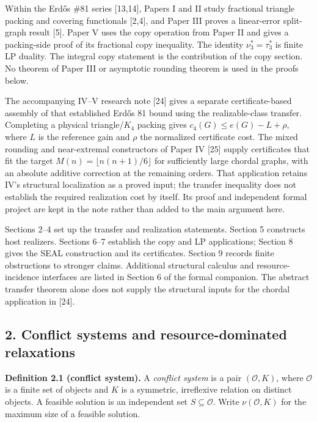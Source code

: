 \documentclass[english,11pt,a4paper]{article}
\begin{document}
Within the Erdős \#81 series {[}13,14{]}, Papers I and II study
fractional triangle packing and covering functionals {[}2,4{]}, and
Paper III proves a linear-error split-graph result {[}5{]}. Paper V uses
the copy operation from Paper II and gives a packing-side proof of its
fractional copy inequality. The identity \(\nu_3^*=\tau_3^*\) is finite
LP duality. The integral copy statement is the contribution of the copy
section. No theorem of Paper III or asymptotic rounding theorem is used
in the proofs below.

The accompanying IV--V research note {[}24{]} gives a separate
certificate-based assembly of that established Erdős 81 bound using the
realizable-class transfer. Completing a physical triangle/\(K_4\)
packing gives \(c_4(G)\le e(G)-L+\rho\), where \(L\) is the reference
gain and \(\rho\) the normalized certificate cost. The mixed rounding
and near-extremal constructors of Paper IV {[}25{]} supply certificates
that fit the target \(M(n)=\lfloor n(n+1)/6\rfloor\) for sufficiently
large chordal graphs, with an absolute additive correction at the
remaining orders. That application retains IV's structural localization
as a proved input; the transfer inequality does not establish the
required realization cost by itself. Its proof and independent formal
project are kept in the note rather than added to the main argument
here.

Sections 2--4 set up the transfer and realization statements. Section 5
constructs host realizers. Sections 6--7 establish the copy and LP
applications; Section 8 gives the SEAL construction and its
certificates. Section 9 records finite obstructions to stronger claims.
Additional structural calculus and resource-incidence interfaces are
listed in Section 6 of the formal companion. The abstract transfer
theorem alone does not supply the structural inputs for the chordal
application in {[}24{]}.

\subsection{2. Conflict systems and resource-dominated
relaxations}\label{conflict-systems-and-resource-dominated-relaxations}

\textbf{Definition 2.1 (conflict system).} A \emph{conflict system} is a
pair \((\mathcal O,K)\), where \(\mathcal O\) is a finite set of objects
and \(K\) is a symmetric, irreflexive relation on distinct objects. A
feasible solution is an independent set \(S\subseteq\mathcal O\). Write
\(\nu(\mathcal O,K)\) for the maximum size of a feasible solution.
\end{document}
